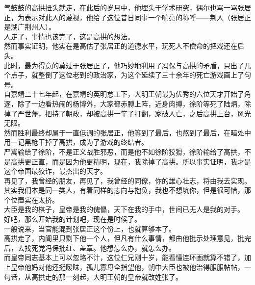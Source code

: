 \begin{multicols}{\theparacolNo}
气鼓鼓的高拱扭头就走，在此后的岁月中，他埋头于学术研究，偶尔也骂一骂张居正，为表示对此人的蔑视，他给了这位昔日同事一个响亮的称呼——荆人（张居正是湖广荆州人）。\\

人走了，事情也该完了，这是高拱的想法。\\

然而事实证明，他实在是高估了张居正的道德水平，玩死人不偿命的把戏还在后头。\\

此时，最为得意的莫过于张居正了，他巧妙地利用了冯保与高拱的矛盾，只出了几个点子，就整倒了这位老到的政治家，为这个延续了三十余年的死亡游戏画上了句号。\\

自嘉靖二十七年起，在嘉靖的英明怠工下，大明王朝最为优秀的六位天才开始了角逐，除了一边看热闹的杨博外，大家都赤膊上阵，近身肉搏，徐阶等死了陆炳，除掉了严世藩，把持了朝政，却被高拱一竿子打翻，家破人亡，之后高拱上台，风光无限。\\

然而胜利最终却属于一直低调的张居正，他等到了最后，也熬到了最后，在暗处中用一记黑枪干掉了高拱，成为了游戏的终结者。\\

严嵩输给了徐阶，不是正义战胜邪恶，而是他不如徐阶狡猾，徐阶输给了高拱，不是高拱更正直，而是因为他更精明，现在，我除掉了高拱。所以事实证明，我才是这个帝国最狡诈，最杰出的天才。\\

再见了，我曾经的朋友，再见了，我曾经的同僚，你的雄心壮志，将由我去实现。\\

其实我们本是同一类人，有着同样的志向与抱负，我也不想坑你，但是很可惜，那个位置实在太挤。\\

大臣是我的棋子，皇帝是我的傀儡，天下在我的手中，世间已无人是我的对手。\\

好吧，那么开始我的计划吧，现在是时候了。\\

一般说来，当官能混到张居正这个份上，也就算够本了。\\

高拱走了，内阁里只剩下他一个人，但凡有什么事情，都由他批示处理意见，批完后，去找死党冯保批红、盖章。他想怎么办，就怎么办。\\

而皇帝同志基本上可以忽略不计，这位仁兄刚十岁，能看懂连环画就算不错了，加上皇帝他妈对他还挺暧昧，孤儿寡母全指望他，朝中大臣也被他治得服服帖帖，一句话，从高拱走的那一刻起，大明王朝的皇帝就改姓张了。\\


\end{multicols}
